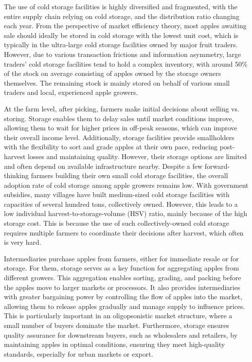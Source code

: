 The use of cold storage facilities is highly diversified and fragmented, with the entire supply chain relying on cold storage, and the distribution ratio changing each year. From the perspective of market efficiency theory, most apples awaiting sale should ideally be stored in cold storage with the lowest unit cost, which is typically in the ultra-large cold storage facilities owned by major fruit traders. However, due to various transaction frictions and information asymmetry, large traders' cold storage facilities tend to hold a complex inventory, with around 50\% of the stock on average consisting of apples owned by the storage owners themselves. The remaining stock is mainly stored on behalf of various small traders and local, experienced apple growers.

At the farm level, after picking, farmers make initial decisions about selling vs. storing. Storage enables them to delay sales until market conditions improve, allowing them to wait for higher prices in off-peak seasons, which can improve their overall income level. Additionally, storage facilities provide smallholders with the flexibility to sort and grade apples at their own pace, reducing post-harvest losses and maintaining quality. However, their storage options are limited and often depend on available infrastructure nearby. Despite a few forward-thinking farmers building their own small cold storage facilities, the overall adoption rate of cold storage among apple growers remains low. With government subsidies, many villages have built medium-sized cold storage facilities with capacities of several hundred tons, collectively owned. However, this leads to a low individual harvest-to-storage-volume (HSV) ratio, mainly because of the high storage cost. This is because the use of such collectively-owned cold storage requires multiple farmers to coordinate their decisions after harvest, which often is very hard.

Intermediaries purchase apples from farmers, either for immediate resale or for storage. For them, storage serves as a key function for aggregating apples from different growers. This aggregation enables sorting, grading, and packing before the apples move to larger markets or processors. It also provides intermediaries with greater bargaining power by controlling the flow of apples into the market, allowing them to release apples gradually and manage supply to influence prices. This is particularly important in an oligopsonistic market structure, where a small number of buyers dominate the market. Furthermore, storage ensures quality assurance for downstream buyers, such as wholesalers and retailers, by maintaining apples in optimal conditions, ensuring they meet high-quality standards, especially for urban markets or export.

